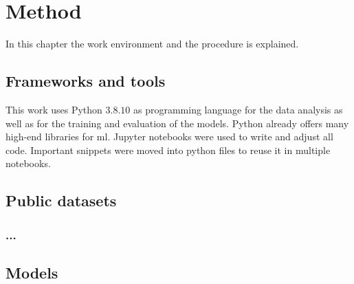 \chapter{Method}
In this chapter the work environment and the procedure is explained. 

\section{Frameworks and tools}
This work uses Python $3.8.10$ as programming language for the data analysis as well as for the training and evaluation of the models. Python already offers many high-end libraries for \gls{ml}. Jupyter notebooks were used to write and adjust all code. Important snippets were moved into python files to reuse it in multiple notebooks.

\section{Public datasets}
\label{section:datasets}

\subsection{...}

\section{Models}

